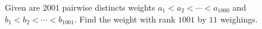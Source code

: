 Given are $2001$ pairwise distincts weights $a_1 < a_2 < \cdots < a_{1000}$ and $b_1 < b_2 < \cdots < b_{1001}$. Find the weight with rank $1001$ by $11$ weighings.
